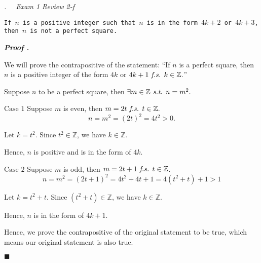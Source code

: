 \documentclass[10pt,letter]{article}
\newcounter{nq}[section]
\newcounter{np}[section]
\newenvironment*{p}{\par\noindent\textbf{\textit{Proof \stepcounter{np}\thenp. }}\par}{\par\hfill $\blacksquare$\par}
\newenvironment*{q}[1]{\noindent\emph{\thesection.\stepcounter{nq}\thenq$\quad $ #1}\par\noindent\texttt}{}
\def\Z{{\mathbb{Z}}}
\def\st{\emph{ s.t. }}
\def\fs{\emph{ f.s. }}
\begin{document}
\begin{framed}\begin{q}
	{Exam 1 Review 2-f}
	{If $n$ is a positive integer such that $n$ is in the form $4k+2$ or $4k+3$, then $n$ is not a perfect square.}
\end{q}\end{framed}
\begin{p}
	We will prove the contrapositive of the statement: ``If $n$ is a perfect square, then $n$ is a positive integer of the form $4k$ or $4k+1\fs k\in\Z.$''\par Suppose $n$ to be a perfect square, then $\exists m\in\Z\st n=m^2.$\par $\boxed{\text{Case }1}$ Suppose $m$ is even, then $m=2t\fs t\in\Z.$\[n=m^2=(2t)^2=4t^2>0.\]\par \hspace*{10mm}Let $k=t^2$. Since $t^2\in\Z$, we have $k\in\Z.$\par\hspace*{10mm}Hence, $n$ is positive and is in the form of $4k$.\par $\boxed{\text{Case }2}$ Suppose $m$ is odd, then $m=2t+1\fs t\in\Z$.\[n=m^2=(2t+1)^2=4t^2+4t+1=4(t^2+t)+1>1\]\par\hspace*{10mm} Let $k=t^2+t$. Since $(t^2+t)\in\Z$, we have $k\in\Z.$\par\hspace*{10mm} Hence, $n$ is in the form of $4k+1$.\par Hence, we prove the contrapositive of the original statement to be true, which means our original statement is also true.	
\end{p}
\end{document}
